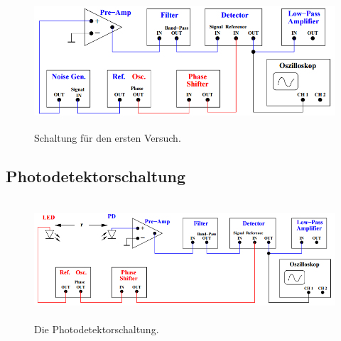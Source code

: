 \begin{figure}
	\centering
	\includegraphics[height=5cm]{picture/Aufbau-Versuch1.png}
	\caption{Schaltung für den ersten Versuch. \cite[4]{sample}}
  \label{img:V1}
\end{figure}

\subsection{Photodetektorschaltung}

\begin{figure}
	\centering
	\includegraphics[height=4.5cm]{picture/Photodetektorschaltung.png}
	\caption{Die Photodetektorschaltung. \cite[5]{sample}}
  \label{img:V2}
\end{figure}
